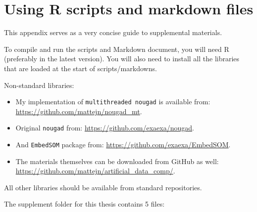 \chapter{Using R scripts and markdown files}

This appendix serves as a very concise guide to supplemental materials.

To compile and run the scripts and Markdown document, you will need R (preferably in the latest version). You will also need to install all the libraries that are loaded at the start of scripts/markdowns.

Non-standard libraries:
\begin{itemize}
    \item My implementation of \texttt{multithreaded nougad} is available from: \url{https://github.com/mattejn/nougad_mt}.
    \item Original \texttt{nougad} from: \url{https://github.com/exaexa/nougad}.
    \item And \texttt{EmbedSOM} package from: \url{https://github.com/exaexa/EmbedSOM}.
    \item The materials themselves can be downloaded from GitHub as well: \url{https://github.com/mattejn/artificial_data_comp/}.
\end{itemize}

All other libraries should be available from standard repositories. 

The supplement folder for this thesis contains 5 files:

